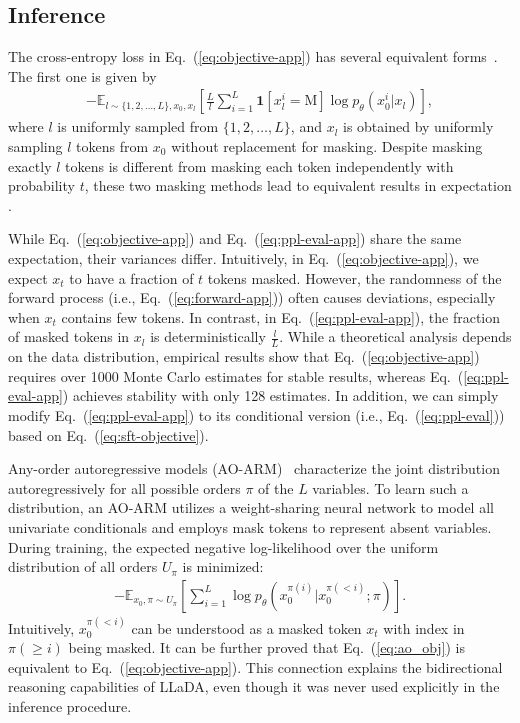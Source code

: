 \documentclass{article}
\begin{document}
\subsection{Inference}
\label{app:for-infer}
   
The cross-entropy loss in Eq.~(\ref{eq:objective-app}) has several equivalent forms~\cite{ou2024your}. The first one is given by
\begin{align}
    -\mathbb{E}_{l\sim \{1, 2, \dots, L\}, x_0, x_l} \left[\frac{L}{l}\sum_{i=1}^L \textbf{1}[x_l^i = \textrm{M}] \log p_{\theta}(x_0^i|x_l) \right],    
\label{eq:ppl-eval-app}
\end{align}
where \( l \) is uniformly sampled from \( \{1, 2, \dots, L\} \), 
and \( x_l \) is obtained by uniformly sampling \( l \) tokens from \( x_0 \) without replacement for masking. Despite masking exactly $l$ tokens is different from masking each token independently with probability $t$, these two masking methods lead to equivalent results in expectation \cite{ou2024your}.


While Eq.~(\ref{eq:objective-app}) and Eq.~(\ref{eq:ppl-eval-app}) share the same expectation, their variances differ. Intuitively, in Eq.~(\ref{eq:objective-app}), we expect \(x_t\) to have a fraction of \(t\) tokens masked. However, the randomness of the forward process (i.e., Eq.~(\ref{eq:forward-app})) often causes deviations, especially when \(x_t\) contains few tokens. In contrast, in Eq.~(\ref{eq:ppl-eval-app}), the fraction of masked tokens in \(x_l\) is deterministically \(\frac{l}{L}\). While a theoretical analysis depends on the data distribution, empirical results show that Eq.~(\ref{eq:objective-app}) requires over 1000 Monte Carlo estimates for stable results, whereas Eq.~(\ref{eq:ppl-eval-app}) achieves stability with only 128 estimates. In addition, we can simply modify Eq.~(\ref{eq:ppl-eval-app}) to its conditional version (i.e., Eq.~(\ref{eq:ppl-eval})) based on Eq.~(\ref{eq:sft-objective}).


Any-order autoregressive models (AO-ARM)~\cite{hoogeboom2021autoregressive, UriaML14,Shih2022TrainingAI} characterize the joint distribution autoregressively for all possible orders $\pi$ of the $L$ variables. To learn such a distribution, an AO-ARM utilizes a weight-sharing neural network to model all univariate conditionals and employs mask tokens to represent absent variables. During training, the expected negative log-likelihood over the uniform distribution of all orders $U_\pi$ is minimized:
\begin{align}
\label{eq:ao_obj}
-\mathbb{E}_{x_0, \pi \sim U_\pi}\left[ \sum_{i=1}^L \log p_\theta(x_0^{\pi(i)}|x_0^{\pi(<i)};\pi)\right].
\end{align}
Intuitively, $x_0^{\pi(<i)}$ can be understood as a masked token $x_t$ with index in ${\pi(\geq i)}$ being masked. It can be further proved that 
Eq.~(\ref{eq:ao_obj}) is equivalent to Eq.~(\ref{eq:objective-app}). This connection explains the bidirectional reasoning capabilities of LLaDA, even though it was never used explicitly in the inference procedure.
\end{document}
